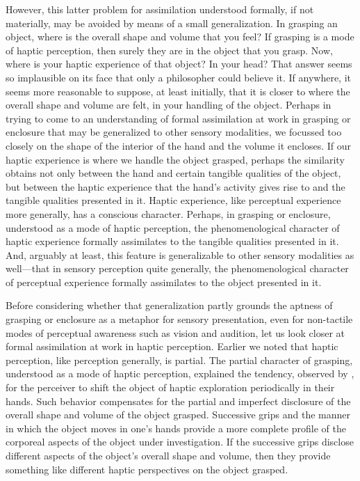 However, this latter problem for assimilation understood formally, if not materially, may be avoided by means of a small generalization. In grasping an object, where is the overall shape and volume that you feel? If grasping is a mode of haptic perception, then surely they are in the object that you grasp. Now, where is your haptic experience of that object? In your head? That answer seems so implausible on its face that only a philosopher could believe it. If anywhere, it seems more reasonable to suppose, at least initially, that it is closer to where the overall shape and volume are felt, in your handling of the object. Perhaps in trying to come to an understanding of formal assimilation at work in grasping or enclosure that may be generalized to other sensory modalities, we focussed too closely on the shape of the interior of the hand and the volume it encloses. If our haptic experience is where we handle the object grasped, perhaps the similarity obtains not only between the hand and certain tangible qualities of the object, but between the haptic experience that the hand's activity gives rise to and the tangible qualities presented in it. Haptic experience, like perceptual experience more generally, has a conscious character. Perhaps, in grasping or enclosure, understood as a mode of haptic perception, the phenomenological character of haptic experience formally assimilates to the tangible qualities presented in it. And, arguably at least, this feature is generalizable to other sensory modalities as well---that in sensory perception quite generally, the phenomenological character of perceptual experience formally assimilates to the object presented in it.

Before considering whether that generalization partly grounds the aptness of grasping or enclosure as a metaphor for sensory presentation, even for non-tactile modes of perceptual awareness such as vision and audition, let us look closer at formal assimilation at work in haptic perception. Earlier we noted that haptic perception, like perception generally, is partial. The partial character of grasping, understood as a mode of haptic perception, explained the tendency, observed by \citet{Lederman:1987fr}, for the perceiver to shift the object of haptic exploration periodically in their hands. Such behavior compensates for the partial and imperfect disclosure of the overall shape and volume of the object grasped. Successive grips and the manner in which the object moves in one's hands provide a more complete profile of the corporeal aspects of the object under investigation. If the successive grips disclose different aspects of the object's overall shape and volume, then they provide something like different haptic perspectives on the object grasped. 

